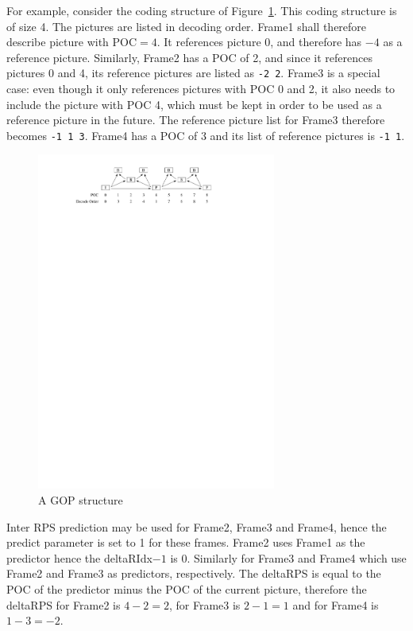 \documentclass[a4paper,11pt]{jctvcdoc}
\begin{document}
For example, consider the coding structure of Figure~\ref{fig:gop-example}.
This coding structure is of size 4. The pictures are listed in decoding
order. Frame1 shall therefore describe picture with $\textrm{POC}=4$. It
references picture 0, and therefore has $-4$ as a reference picture.
Similarly, Frame2 has a POC of 2, and since it references pictures 0 and
4, its reference pictures are listed as \verb|-2 2|. Frame3 is a special
case: even though it only references pictures with POC 0 and 2, it also
needs to include the picture with POC 4, which must be kept in order to
be used as a reference picture in the future. The reference picture list
for Frame3 therefore becomes \verb|-1 1 3|. Frame4 has a POC of 3 and
its list of reference pictures is \verb|-1 1|.

\begin{figure}[h]
    \caption{A GOP structure}
    \label{fig:gop-example}
    \centering
    \includegraphics[width=0.7\textwidth]{gop-structure-example}
\end{figure}

Inter RPS prediction may be used for Frame2, Frame3 and Frame4, hence
the predict parameter is set to 1 for these frames. Frame2 uses Frame1
as the predictor hence the deltaRIdx$-1$ is 0.  Similarly for Frame3 and
Frame4 which use Frame2 and Frame3 as predictors, respectively. The
deltaRPS is equal to the POC of the predictor minus the POC of the
current picture, therefore the deltaRPS for Frame2 is $4 -2 = 2$, for
Frame3 is $2 - 1 = 1$ and for Frame4 is $1 - 3 = -2$.
\end{document}
